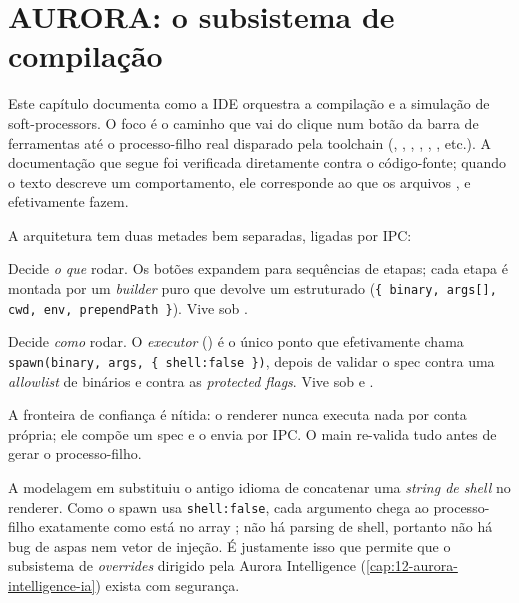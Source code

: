 \chapter{AURORA: o subsistema de compilação}
\label{cap:08-aurora-compilacao}

Este capítulo documenta como a IDE  orquestra a compilação e a
simulação de soft-processors. O foco é o caminho que vai do clique num botão da
barra de ferramentas até o processo-filho real disparado pela toolchain
(, , , ,
, , etc.). A documentação que segue foi verificada
diretamente contra o código-fonte; quando o texto descreve um comportamento, ele
corresponde ao que os arquivos ,  e
 efetivamente fazem.

A arquitetura tem duas metades bem separadas, ligadas por IPC:

\begin{description}[leftmargin=1.4em]
  \item[Renderer (processo da janela).] Decide \emph{o que} rodar. Os botões
    expandem para sequências de etapas; cada etapa é montada por um
    \emph{builder} puro que devolve um  estruturado
    (\lstinline|{ binary, args[], cwd, env, prependPath }|). Vive sob
    .
  \item[Main (processo principal do Electron).] Decide \emph{como} rodar. O
    \emph{executor} () é o único ponto que
    efetivamente chama \lstinline|spawn(binary, args, { shell:false })|, depois de
    validar o spec contra uma \emph{allowlist} de binários e contra as
    \emph{protected flags}. Vive sob  e
    .
\end{description}

A fronteira de confiança é nítida: o renderer nunca executa nada por conta
própria; ele compõe um spec e o envia por IPC. O main re-valida tudo antes de
gerar o processo-filho.

\begin{nota}
A modelagem em  substituiu o antigo idioma de concatenar uma
\emph{string de shell} no renderer. Como o spawn usa \lstinline|shell:false|,
cada argumento chega ao processo-filho exatamente como está no array
; não há parsing de shell, portanto não há bug de aspas nem vetor de
injeção. É justamente isso que permite que o subsistema de \emph{overrides}
dirigido pela Aurora Intelligence (\autoref{cap:12-aurora-intelligence-ia}) exista
com segurança.
\end{nota}

